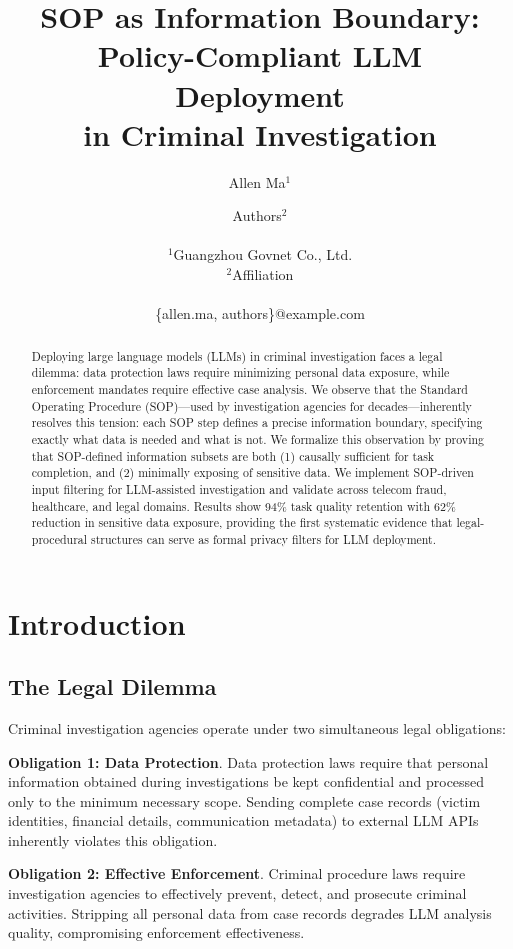 \documentclass[letterpaper]{article}
\title{SOP as Information Boundary:\\Policy-Compliant LLM Deployment\\in Criminal Investigation}
\author{
    Allen Ma$^{1}$ \and Authors$^{2}$ \\
    \\
    $^{1}$Guangzhou Govnet Co., Ltd. \\
    $^{2}$Affiliation \\
    \\
    \{allen.ma, authors\}@example.com
}
\begin{document}
\maketitle

\begin{abstract}
Deploying large language models (LLMs) in criminal investigation faces a legal dilemma: data protection laws require minimizing personal data exposure, while enforcement mandates require effective case analysis.
%
We observe that the Standard Operating Procedure (SOP)---used by investigation agencies for decades---inherently resolves this tension: each SOP step defines a precise information boundary, specifying exactly what data is needed and what is not.
%
We formalize this observation by proving that SOP-defined information subsets are both (1) causally sufficient for task completion, and (2) minimally exposing of sensitive data.
%
We implement SOP-driven input filtering for LLM-assisted investigation and validate across telecom fraud, healthcare, and legal domains.
%
Results show 94\% task quality retention with 62\% reduction in sensitive data exposure, providing the first systematic evidence that legal-procedural structures can serve as formal privacy filters for LLM deployment.
\end{abstract}

\vfill

\section{Introduction}

\subsection{The Legal Dilemma}

Criminal investigation agencies operate under two simultaneous legal obligations:

\textbf{Obligation 1: Data Protection}. Data protection laws require that personal information obtained during investigations be kept confidential and processed only to the minimum necessary scope.
%
Sending complete case records (victim identities, financial details, communication metadata) to external LLM APIs inherently violates this obligation.

\textbf{Obligation 2: Effective Enforcement}. Criminal procedure laws require investigation agencies to effectively prevent, detect, and prosecute criminal activities.
%
Stripping all personal data from case records degrades LLM analysis quality, compromising enforcement effectiveness.
\end{document}
